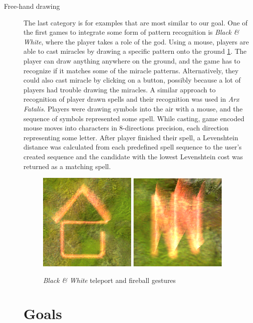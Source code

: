 \begin{description}
\item[Free-hand drawing]
The last category is for examples that are most similar to our goal. One of the first games to integrate some form of pattern recognition is \emph{Black \& White}, where the player takes a role of the god. Using a mouse, players are able to cast miracles by drawing a specific pattern onto the ground \ref{fig:blackwhite}. The player can draw anything anywhere on the ground, and the game has to recognize if it matches some of the miracle patterns. Alternatively, they could also cast miracle by clicking on a button, possibly because a lot of players had trouble drawing the miracles. A similar approach to recognition of player drawn spells and their recognition was used in \emph{Arx Fatalis}. Players were drawing symbols into the air with a mouse, and the sequence of symbols represented some spell. While casting, game encoded mouse moves into characters in 8-directions precision, each direction representing some letter. After player finished their spell, a Levenshtein distance was calculated from each predefined spell sequence to the user's created sequence and the candidate with the lowest Levenshtein cost was returned as a matching spell.

\begin{figure}
\centering
\includegraphics[width=.3\linewidth]{ext/gestureteleport.png}
\quad
\includegraphics[width=.3\linewidth]{ext/gesturefireball.png}
\caption{\emph{Black \& White} teleport and fireball gestures}
\label{fig:blackwhite}
\end{figure}

\section{Goals}


\end{description}
